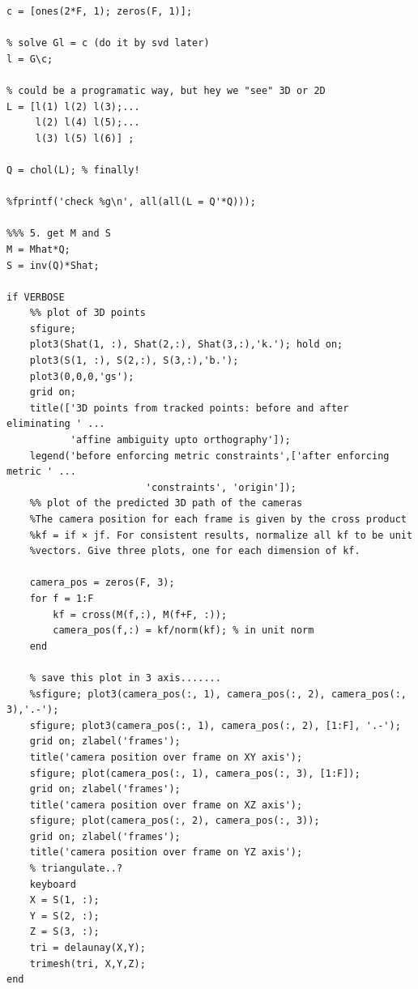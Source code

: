 \begin{verbatim}
c = [ones(2*F, 1); zeros(F, 1)];

% solve Gl = c (do it by svd later)
l = G\c;

% could be a programatic way, but hey we "see" 3D or 2D
L = [l(1) l(2) l(3);...
     l(2) l(4) l(5);...
     l(3) l(5) l(6)] ;

Q = chol(L); % finally!

%fprintf('check %g\n', all(all(L = Q'*Q)));

%%% 5. get M and S
M = Mhat*Q;
S = inv(Q)*Shat;

if VERBOSE
    %% plot of 3D points
    sfigure;
    plot3(Shat(1, :), Shat(2,:), Shat(3,:),'k.'); hold on;
    plot3(S(1, :), S(2,:), S(3,:),'b.');
    plot3(0,0,0,'gs');
    grid on;
    title(['3D points from tracked points: before and after eliminating ' ...
           'affine ambiguity upto orthography']);
    legend('before enforcing metric constraints',['after enforcing metric ' ...
                        'constraints', 'origin']);
    %% plot of the predicted 3D path of the cameras
    %The camera position for each frame is given by the cross product
    %kf = if × jf. For consistent results, normalize all kf to be unit
    %vectors. Give three plots, one for each dimension of kf.
    
    camera_pos = zeros(F, 3);
    for f = 1:F
        kf = cross(M(f,:), M(f+F, :));
        camera_pos(f,:) = kf/norm(kf); % in unit norm
    end

    % save this plot in 3 axis.......
    %sfigure; plot3(camera_pos(:, 1), camera_pos(:, 2), camera_pos(:, 3),'.-');
    sfigure; plot3(camera_pos(:, 1), camera_pos(:, 2), [1:F], '.-');
    grid on; zlabel('frames');
    title('camera position over frame on XY axis');
    sfigure; plot(camera_pos(:, 1), camera_pos(:, 3), [1:F]);
    grid on; zlabel('frames');
    title('camera position over frame on XZ axis');
    sfigure; plot(camera_pos(:, 2), camera_pos(:, 3));
    grid on; zlabel('frames');
    title('camera position over frame on YZ axis');
    % triangulate..?
    keyboard
    X = S(1, :);
    Y = S(2, :);
    Z = S(3, :);
    tri = delaunay(X,Y);
    trimesh(tri, X,Y,Z);
end
\end{verbatim}





